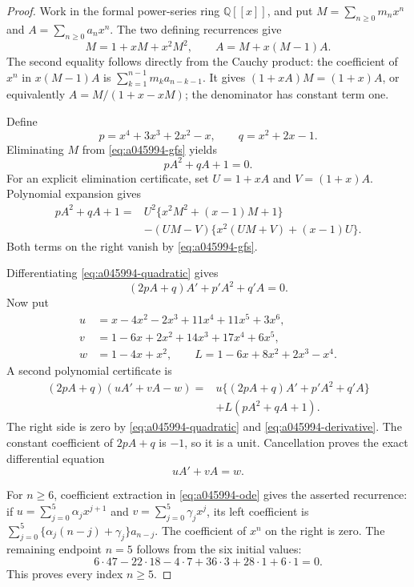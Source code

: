 \documentclass[11pt]{article}
\begin{document}
\begin{proof}
Work in the formal power-series ring $\mathbb Q[[x]]$, and put
$M=\sum_{n\ge0}m_nx^n$ and $A=\sum_{n\ge0}a_nx^n$.
The two defining recurrences give
\begin{equation}\label{eq:a045994-gfs}
 M=1+xM+x^2M^2,\qquad A=M+x(M-1)A.
\end{equation}
The second equality follows directly from the Cauchy product:
the coefficient of $x^n$ in $x(M-1)A$ is
$\sum_{k=1}^{n-1}m_ka_{n-k-1}$.
It gives $(1+xA)M=(1+x)A$, or equivalently
$A=M/(1+x-xM)$; the denominator has constant term one.

Define
\[
 p=x^4+3x^3+2x^2-x,\qquad q=x^2+2x-1.
\]
Eliminating $M$ from \eqref{eq:a045994-gfs} yields
\begin{equation}\label{eq:a045994-quadratic}
 pA^2+qA+1=0.
\end{equation}
For an explicit elimination certificate, set $U=1+xA$ and
$V=(1+x)A$. Polynomial expansion gives
\[
\begin{aligned}
pA^2+qA+1={}&
 U^2\{x^2M^2+(x-1)M+1\}\\
 &-(UM-V)\{x^2(UM+V)+(x-1)U\}.
\end{aligned}
\]
Both terms on the right vanish by \eqref{eq:a045994-gfs}.

Differentiating \eqref{eq:a045994-quadratic} gives
\begin{equation}\label{eq:a045994-derivative}
 (2pA+q)A'+p'A^2+q'A=0.
\end{equation}
Now put
\[
\begin{aligned}
u&=x-4x^2-2x^3+11x^4+11x^5+3x^6,\\
v&=1-6x+2x^2+14x^3+17x^4+6x^5,\\
w&=1-4x+x^2,\qquad
L=1-6x+8x^2+2x^3-x^4.
\end{aligned}
\]
A second polynomial certificate is
\[
\begin{aligned}
(2pA+q)(uA'+vA-w)
={}&u\{(2pA+q)A'+p'A^2+q'A\}\\
&+L(pA^2+qA+1).
\end{aligned}
\]
The right side is zero by \eqref{eq:a045994-quadratic} and
\eqref{eq:a045994-derivative}. The constant coefficient of
$2pA+q$ is $-1$, so it is a unit. Cancellation proves the exact
differential equation
\begin{equation}\label{eq:a045994-ode}
 uA'+vA=w.
\end{equation}

For $n\ge6$, coefficient extraction in
\eqref{eq:a045994-ode} gives the asserted recurrence: if
$u=\sum_{j=0}^{5}\alpha_jx^{j+1}$ and
$v=\sum_{j=0}^{5}\gamma_jx^j$, its left coefficient is
$\sum_{j=0}^{5}\{\alpha_j(n-j)+\gamma_j\}a_{n-j}$.
The coefficient of $x^n$ on the right is zero.
The remaining endpoint $n=5$ follows from the six initial values:
\[
6\cdot47-22\cdot18-4\cdot7+36\cdot3+28\cdot1+6\cdot1=0.
\]
This proves every index $n\ge5$.
\end{proof}
\end{document}
